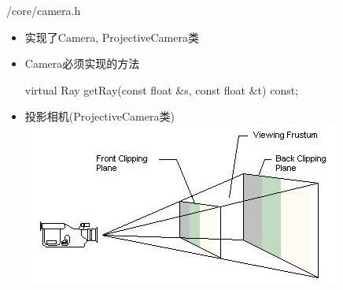 \documentclass{beamer}
\begin{document}
\begin{frame} {/core/camera.h}
\begin{itemize}
\item 实现了Camera, ProjectiveCamera类
\item Camera必须实现的方法
\begin{semiverbatim} virtual Ray getRay(const float \&s, const float \&t) const; \end{semiverbatim}
\item 投影相机(ProjectiveCamera类)
\includegraphics[scale=1]{projectivecamera.jpg}
\end{itemize}
\end{frame}
\end{document}
